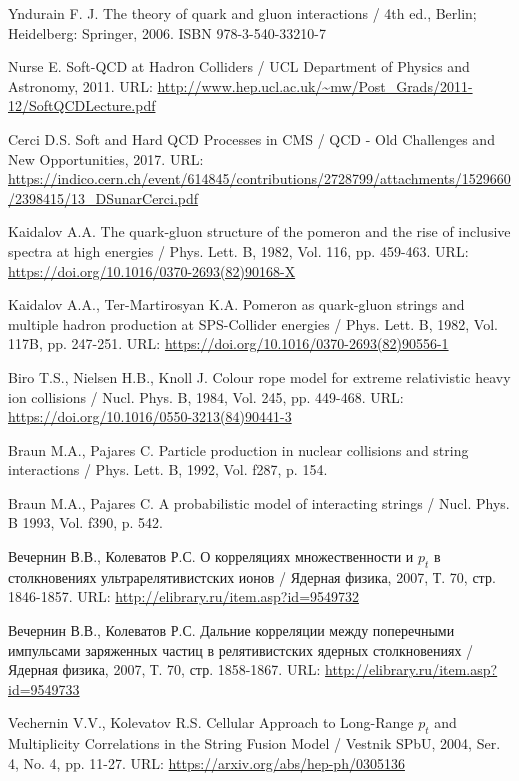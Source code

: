 \begin{thebibliography}{24}
Yndurain F. J.
The theory of quark and gluon interactions / 
4th ed., Berlin; 
Heidelberg: Springer, 
2006.
ISBN 978-3-540-33210-7

Nurse E.
Soft-QCD at Hadron Colliders /
UCL Department of Physics and Astronomy, 
2011.
URL: \url{http://www.hep.ucl.ac.uk/~mw/Post_Grads/2011-12/SoftQCDLecture.pdf}

Cerci D.S.
Soft and Hard QCD Processes in CMS /
QCD - Old Challenges and New Opportunities, 2017.
URL: \url{https://indico.cern.ch/event/614845/contributions/2728799/attachments/1529660/2398415/13_DSunarCerci.pdf}

Kaidalov A.A. The quark-gluon structure of the pomeron and the rise of inclusive spectra at high energies /
Phys. Lett. B,
1982,
Vol. 116,
pp. 459-463.
URL: \url{https://doi.org/10.1016/0370-2693(82)90168-X}

Kaidalov A.A., Ter-Martirosyan K.A.
Pomeron as quark-gluon strings and multiple hadron production at SPS-Collider energies /
Phys. Lett. B,
1982,
Vol. 117B,
pp. 247-251.
URL: \url{https://doi.org/10.1016/0370-2693(82)90556-1}

Biro T.S., Nielsen H.B., Knoll J.
Colour rope model for extreme relativistic heavy ion collisions /
Nucl. Phys. B,  
1984,
Vol. 245,
pp. 449-468.
URL: \url{https://doi.org/10.1016/0550-3213(84)90441-3}

Braun M.A., Pajares C. 
Particle production in nuclear collisions and string interactions /
Phys. Lett. B, 
1992,
Vol. f287,
p. 154.

Braun M.A., Pajares C. 
A probabilistic model of interacting strings /
Nucl. Phys. B
1993,
Vol. f390,
p. 542.

Вечернин В.В., Колеватов Р.С.
О корреляциях множественности и $p_t$ в столкновениях ультрарелятивистских ионов /
Ядерная физика,
2007,
Т. 70,
стр. 1846-1857.
URL: \url{http://elibrary.ru/item.asp?id=9549732}

Вечернин В.В., Колеватов Р.С.
Дальние корреляции между поперечными импульсами заряженных частиц в релятивистских ядерных столкновениях /
Ядерная физика,
2007,
Т. 70,
стр. 1858-1867.
URL: \url{http://elibrary.ru/item.asp?id=9549733}

Vechernin V.V., Kolevatov R.S.
Cellular Approach to Long-Range $p_t$ and Multiplicity Correlations in the String Fusion Model /
Vestnik SPbU,
2004,
Ser. 4, No. 4,
pp. 11-27.
URL: \url{https://arxiv.org/abs/hep-ph/0305136}


\end{thebibliography}
